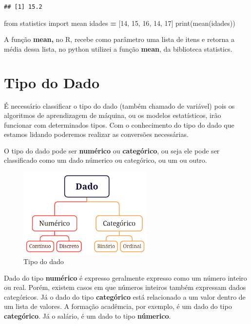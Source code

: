 \documentclass[
]{book}
\newenvironment{Shaded}{\begin{snugshade}}{\end{snugshade}}
\newcommand{\BuiltInTok}[1]{#1}
\newcommand{\DecValTok}[1]{\textcolor[rgb]{0.00,0.00,0.81}{#1}}
\newcommand{\ImportTok}[1]{#1}
\newcommand{\NormalTok}[1]{#1}
\newcommand{\OperatorTok}[1]{\textcolor[rgb]{0.81,0.36,0.00}{\textbf{#1}}}
\begin{document}
\begin{verbatim}
## [1] 15.2
\end{verbatim}

\begin{Shaded}
\begin{Highlighting}[]
\ImportTok{from}\NormalTok{ statistics }\ImportTok{import}\NormalTok{ mean }
\NormalTok{idades }\OperatorTok{=}\NormalTok{ [}\DecValTok{14}\NormalTok{, }\DecValTok{15}\NormalTok{, }\DecValTok{16}\NormalTok{, }\DecValTok{14}\NormalTok{, }\DecValTok{17}\NormalTok{]}
\BuiltInTok{print}\NormalTok{(mean(idades))}
\end{Highlighting}
\end{Shaded}

A função \textbf{mean,} no R, recebe como parâmetro uma lista de itens e retorna a média dessa lista, no python utilizei a função \textbf{mean}, da biblioteca statistics.

\hypertarget{tipo-do-dado}{%
\section{Tipo do Dado}\label{tipo-do-dado}}

É necessário classificar o tipo do dado (também chamado de variável) pois os algoritmos de aprendizagem de máquina, ou os modelos estatísticos, irão funcionar com determinados tipos. Com o conhecimento do tipo do dado que estamos lidando poderemos realizar as conversões necessárias.

O tipo do dado pode ser \textbf{numérico} ou \textbf{categórico}, ou seja ele pode ser classificado como um dado númerico ou categórico, ou um ou outro.

\begin{figure}
\centering
\includegraphics[width=2.64583in,height=\textheight]{figuras/tipo_dado.png}
\caption{Tipo do dado}
\end{figure}

Dado do tipo \textbf{numérico} é expresso geralmente expresso como um número inteiro ou real. Porém, existem casos em que números inteiros também expressam dados categóricos. Já o dado do tipo \textbf{categórico} está relacionado a um valor dentro de um lista de valores. A formação acadêmcia, por exemplo, é um dado do tipo \textbf{categórico}. Já o salário, é um dado to tipo \textbf{númerico}.
\end{document}
